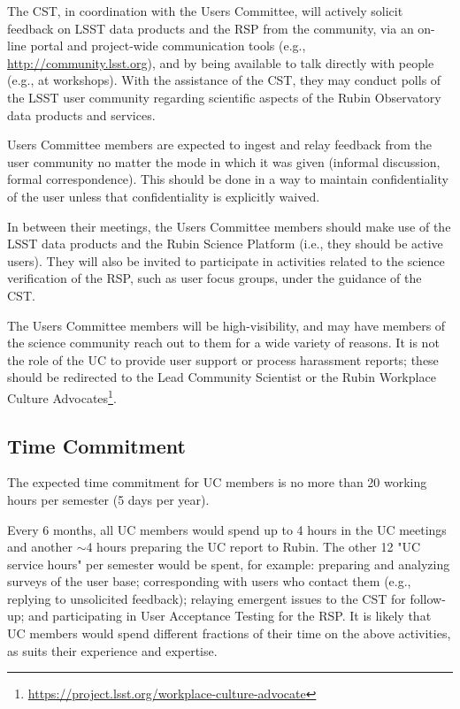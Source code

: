 \documentclass[OPS,toc]{lsstdoc}
\begin{document}
The CST, in coordination with the Users Committee, will actively solicit feedback on LSST data products and the RSP from the community, via an on-line portal and project-wide communication tools (e.g., \url{http://community.lsst.org}), and by being available to talk directly with people (e.g., at workshops).
With the assistance of the CST, they may conduct polls of the LSST user community regarding scientific aspects of the Rubin Observatory data products and services.

Users Committee members are expected to ingest and relay feedback from the user community no matter the mode in which it was given (informal discussion, formal correspondence).
This should be done in a way to maintain confidentiality of the user unless that confidentiality is explicitly waived. 

In between their meetings, the Users Committee members should make use of the LSST data products and the 
Rubin Science Platform (i.e., they should be active users).
They will also be invited to participate in activities related to the science verification of the RSP, 
such as user focus groups, under the guidance of the CST.

The Users Committee members will be high-visibility, and may have members of the
science community reach out to them for a wide variety of reasons.
It is not the role of the UC to provide user support or process harassment reports;
these should be redirected to the Lead Community Scientist or the 
Rubin Workplace Culture Advocates\footnote{\url{https://project.lsst.org/workplace-culture-advocate}}.


\subsection{Time Commitment}

The expected time commitment for UC members is no more than 20 working hours per semester (5 days per year).

Every 6 months, all UC members would spend up to 4 hours in the UC meetings and another $\sim$4 hours preparing the UC report to Rubin.
The other 12 "UC service hours" per semester would be spent, for example: preparing and analyzing surveys of the user base; corresponding with users who contact them (e.g., replying to unsolicited feedback); relaying emergent issues to the CST for follow-up; and participating in User Acceptance Testing for the RSP. 
It is likely that UC members would spend different fractions of their time on the above activities, as suits their experience and expertise.
\end{document}
